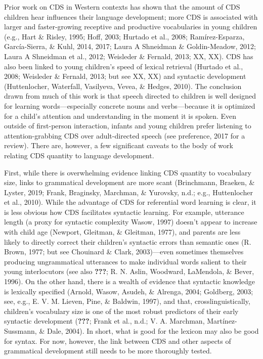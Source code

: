 \documentclass[floatsintext,man]{apa6}
\theoremstyle{definition}
\theoremstyle{definition}
\theoremstyle{definition}
\theoremstyle{remark}
\begin{document}
Prior work on CDS in Western contexts has shown that the amount of CDS
children hear influences their language development; more CDS is
associated with larger and faster-growing receptive and productive
vocabularies in young children (e.g., Hart \& Risley, 1995; Hoff, 2003;
Hurtado et al., 2008; Ramírez-Esparza, García-Sierra, \& Kuhl, 2014,
2017; Laura A Shneidman \& Goldin-Meadow, 2012; Laura A Shneidman et
al., 2012; Weisleder \& Fernald, 2013; XX, XX). CDS has also been linked
to young children's speed of lexical retrieval (Hurtado et al., 2008;
Weisleder \& Fernald, 2013; but see XX, XX) and syntactic development
(Huttenlocher, Waterfall, Vasilyeva, Vevea, \& Hedges, 2010). The
conclusion drawn from much of this work is that speech directed to
children is well designed for learning words---especially concrete nouns
and verbs---because it is optimized for a child's attention and
understanding in the moment it is spoken. Even outside of first-person
interaction, infants and young children prefer listening to
attention-grabbing CDS over adult-directed speech (see preference, 2017
for a review). There are, however, a few significant caveats to the body
of work relating CDS quantity to language development.

First, while there is overwhelming evidence linking CDS quantity to
vocabulary size, links to grammatical development are more scant
(Brinchmann, Braeken, \& Lyster, 2019; Frank, Braginsky, Marchman, \&
Yurovsky, n.d.; e.g., Huttenlocher et al., 2010). While the advantage of
CDS for referential word learning is clear, it is less obvious how CDS
facilitates syntactic learning. For example, utterance length (a proxy
for syntactic complexity Wasow, 1997) doesn't appear to increase with
child age (Newport, Gleitman, \& Gleitman, 1977), and parents are less
likely to directly correct their children's syntactic errors than
semantic ones (R. Brown, 1977; but see Chouinard \& Clark, 2003)---even
sometimes themselves producing ungrammatical utterances to make
individual words salient to their young interlocutors (see also
{\textbf{???}}; R. N. Aslin, Woodward, LaMendola, \& Bever, 1996). On
the other hand, there is a wealth of evidence that syntactic knowledge
is lexically specified (Arnold, Wasow, Asudeh, \& Alrenga, 2004;
Goldberg, 2003; see, e.g., E. V. M. Lieven, Pine, \& Baldwin, 1997), and
that, crosslinguistically, children's vocabulary size is one of the most
robust predictors of their early syntactic development ({\textbf{???}};
Frank et al., n.d.; V. A. Marchman, Martínez-Sussmann, \& Dale, 2004).
In short, what is good for the lexicon may also be good for syntax. For
now, however, the link between CDS and other aspects of grammatical
development still needs to be more thoroughly tested.
\end{document}
